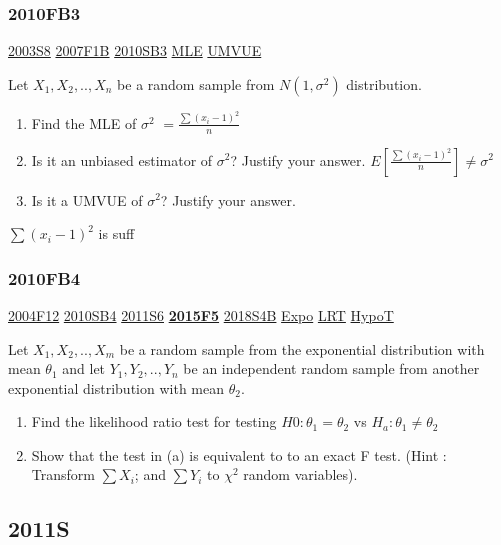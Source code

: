 \documentclass[10pt,twocolumn,portrait]{article}
\begin{document}
\hypertarget{fb3-1}{%
\subsubsection{2010FB3}\label{fb3-1}}

\protect\hyperlink{s8}{2003S8} \protect\hyperlink{f1b}{2007F1B}
\protect\hyperlink{sb3-1}{2010SB3} \protect\hyperlink{MLE}{MLE}
\protect\hyperlink{section-5}{UMVUE}

Let \(X_1,X_2,..,X_n\) be a random sample from \(N(1,\sigma^2)\)
distribution.

\begin{enumerate}
\def\labelenumi{(\alph{enumi})}
\item
  Find the MLE of \(\sigma^2\) \(=\frac{\sum(x_i-1)^2}{n}\)
\item
  Is it an unbiased estimator of \(\sigma^2\)? Justify your answer.
  \(E[\frac{\sum(x_i-1)^2}{n}]\neq\sigma^2\)
\item
  Is it a UMVUE of \(\sigma^2\)? Justify your answer.
\end{enumerate}

\(\sum(x_i-1)^2\) is suff

\hypertarget{fb4-1}{%
\subsubsection{2010FB4}\label{fb4-1}}

\protect\hyperlink{f12}{2004F12} \protect\hyperlink{sb4}{2010SB4}
\protect\hyperlink{s6-2}{2011S6}
\textbf{\protect\hyperlink{f5-5}{2015F5}}
\protect\hyperlink{s4b-2}{2018S4B} \protect\hyperlink{Expo}{Expo}
\protect\hyperlink{LRT}{LRT} \protect\hyperlink{HypoT}{HypoT}

Let \(X_1,X_2,..,X_{m}\) be a random sample from the exponential
distribution with mean \(\theta_1\) and let \(Y_1,Y_2,..,Y_{n}\) be an
independent random sample from another exponential distribution with
mean \(\theta_2\).

\begin{enumerate}
\def\labelenumi{(\alph{enumi})}
\item
  Find the likelihood ratio test for testing \(H0:\theta_1=\theta_2\) vs
  \(H_a:\theta_1\neq\theta_2\)
\item
  Show that the test in (a) is equivalent to to an exact F test. (Hint :
  Transform \(\sum X_i\); and \(\sum Y_i\) to \(\chi^2\) random
  variables).
\end{enumerate}

\hypertarget{s-5}{%
\subsection{2011S}\label{s-5}}
\end{document}
